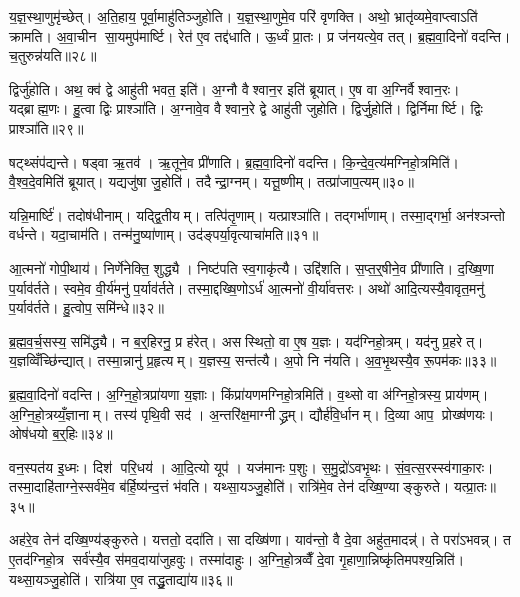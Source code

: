 य॒ज्ञ॒स्था॒णुमृ॑च्छेत्। अ॒ति॒हाय॒ पूर्वा॒माहु॑तिञ्जुहोति। य॒ज्ञ॒स्था॒णुमे॒व परि॑ वृणक्ति। अथो॒ भ्रातृ॑व्यमे॒वाप्त्वाऽति॑ क्रामति। अ॒वा॒चीन सा॒यमुप॑मार्ष्टि। रेत॑ ए॒व तद्द॑धाति। ऊ॒र्ध्वं प्रा॒तः। प्र ज॑नयत्ये॒व तत्। ब्र॒ह्म॒वा॒दिनो॑ वदन्ति। च॒तुरुन्न॑यति॥२८॥

द्विर्जु॑होति। अथ॒ क्व॑ द्वे आहु॑ती भवत॒ इति॑। अ॒ग्नौ वैश्वान॒र इति॑ ब्रूयात्। ए॒ष वा अ॒ग्निर्वैश्वान॒रः। यद्ब्राह्म॒णः। हु॒त्वा द्विः प्राश्ञा॑ति। अ॒ग्नावे॒व वैश्वान॒रे द्वे आहु॑ती जुहोति। द्विर्जु॒होति॑। द्विर्निमार्ष्टि। द्विः प्राश्ञा॑ति॥२९॥

षट्थ्संप॑द्यन्ते। षड्वा ऋ॒तव॑। ऋ॒तूने॒व प्री॑णाति। ब्र॒ह्म॒वा॒दिनो॑ वदन्ति। कि॒न्दे॒व॒त्य॑मग्निहो॒त्रमिति॑। वै॒श्व॒दे॒वमिति॑ ब्रूयात्। यद्यजु॑षा जु॒होति॑। तदैन्द्रा॒ग्नम्। यत्तू॒ष्णीम्। तत्प्रा॑जाप॒त्यम्॥३०॥

यन्नि॒मार्ष्टि॑। तदोष॑धीनाम्। यद्द्वि॒तीयम्। तत्पि॑तृ॒णाम्। यत्प्राश्ञा॑ति। तद्गर्भा॑णाम्। तस्मा॒द्गर्भा॒ अन॑श्ञन्तो वर्धन्ते। यदा॒चाम॑ति। तन्म॑नु॒ष्या॑णाम्। उद॑ङ्पर्या॒वृत्याचा॑मति॥३१॥

आ॒त्मनो॑ गोपी॒थाय॑। निर्णे॑नेक्ति॒ शुद्ध्यै। निष्ट॑पति स्व॒गाकृ॑त्यै। उद्दि॑शति। स॒प्त॒र्॒षीने॒व प्री॑णाति। द॒ख्षि॒णा प॒र्याव॑र्तते। स्वमे॒व वी॒र्य॑मनु॑ प॒र्याव॑र्तते। तस्मा॒द्दख्षि॒णोऽर्ध॑ आ॒त्मनो॑ वी॒र्या॑वत्तरः। अथो॑ आदि॒त्यस्यै॒वावृत॒मनु॑ प॒र्याव॑र्तते। हु॒त्वोप॒ समि॑न्धे॥३२॥

ब्र॒ह्म॒व॒र्च॒सस्य॒ समि॑द्ध्यै। न ब॒र्॒हिरनु॒ प्र ह॑रेत्। असस्थितो॒ वा ए॒ष य॒ज्ञः। यद॑ग्निहो॒त्रम्। यद॑नु प्र॒हरेत्। य॒ज्ञव्विँच्छि॑न्द्यात्। तस्मा॒न्नानु॑ प्र॒हृत्यम्। य॒ज्ञस्य॒ सन्त॑त्यै। अ॒पो नि न॑यति। अ॒व॒भृ॒थस्यै॒व रू॒पम॑कः॥३३॥\anuvakamend[अ॒भ॒व॒न्भ॒व॒ति॒ जु॒हु॒यान्न॑यति मार्ष्टि॒ द्विःप्राश्ञा॑ति प्राजाप॒त्यमाचा॑मतीन्धेऽकः]

ब्र॒ह्म॒वा॒दिनो॑ वदन्ति। अ॒ग्नि॒हो॒त्रप्रा॑यणा य॒ज्ञाः। किंप्रा॑यणमग्निहो॒त्रमिति॑। व॒थ्सो वा अ॑ग्निहो॒त्रस्य॒ प्राय॑णम्। अ॒ग्नि॒हो॒त्रय्यँ॒ज्ञानाम्। तस्य॑ पृथि॒वी सद॑। अ॒न्तरि॑क्ष॒माग्नीद्ध्रम्। द्यौर्\mbox{}ह॑वि॒र्धानम्। दि॒व्या आप॒ प्रोख्ष॑णयः। ओष॑धयो ब॒र्॒हिः॥३४॥

वन॒स्पत॑य इ॒ध्मः। दिश॑ परि॒धय॑। आ॒दि॒त्यो यूप॑। यज॑मानः प॒शुः। स॒मु॒द्रो॑ऽवभृ॒थः। सं॒व॒त्स॒रस्स्व॑गाका॒रः। तस्मा॒दाहि॑ताग्ने॒स्सर्व॑मे॒व ब॑र्\mbox{}हि॒ष्य॑न्द॒त्तं भ॑वति। यथ्सा॒यञ्जु॒होति॑। रात्रि॑मे॒व तेन॑ दख्षि॒ण्याङ्कुरुते। यत्प्रा॒तः॥३५॥

अह॑रे॒व तेन॑ दख्षि॒ण्य॑ङ्कुरुते। यत्ततो॒ ददा॑ति। सा दख्षि॑णा। याव॑न्तो॒ वै दे॒वा अहु॑त॒मादन्न्॑। ते परा॑ऽभवन्न्। त ए॒तद॑ग्निहो॒त्र सर्व॑स्यै॒व स॑मव॒दाया॑जुहवुः। तस्मा॑दाहुः। अ॒ग्नि॒हो॒त्रव्वैँ दे॒वा गृ॒हाणा॒न्निष्कृ॑तिमपश्य॒न्निति॑। यथ्सा॒यञ्जु॒होति॑। रात्रि॑या ए॒व तद्धु॒ताद्या॑य॥३६॥

